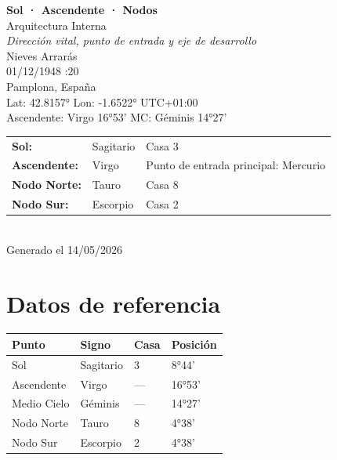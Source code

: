 \documentclass[11pt,a4paper]{article}
\begin{document}
\begin{titlepage}
  \centering
  \vspace*{1.5cm}
  {\Huge\bfseries\color{azulai} Sol · Ascendente · Nodos}\\[0.5cm]
  {\large\color{grisai} Arquitectura Interna}\\[0.3cm]
  {\small\itshape\color{grisai} Dirección vital, punto de entrada y eje de desarrollo}\\[2cm]
  {\huge\color{doradoai} Nieves Arrarás}\\[1.5cm]
  {\Large 01/12/1948 :20}\\[0.3cm]
  {\Large Pamplona, España}\\[0.3cm]
  {\normalsize Lat: 42.8157° \quad Lon: -1.6522° \quad UTC+01:00}\\[0.3cm]
  {\normalsize Ascendente: Virgo 16°53' \quad
    MC: Géminis 14°27'}\\[2cm]
  \begin{tabular}{lll}
    \textbf{Sol:} & Sagitario & Casa 3 \\
    \textbf{Ascendente:} & Virgo & Punto de entrada principal: Mercurio \\
    \textbf{Nodo Norte:} & Tauro & Casa 8 \\
    \textbf{Nodo Sur:}   & Escorpio & Casa 2 \\
  \end{tabular}\\[2cm]
  \vfill
  {\small Generado el 14/05/2026}
\end{titlepage}

\tableofcontents
\newpage

\section{Datos de referencia}

\begin{center}
\begin{tabular}{llll}
  \toprule
  \textbf{Punto} & \textbf{Signo} & \textbf{Casa} & \textbf{Posición} \\
  \midrule
  Sol           & Sagitario & 3 & 8°44' \\
  Ascendente    & Virgo & --- & 16°53' \\
  Medio Cielo   & Géminis & --- & 14°27' \\
  Nodo Norte    & Tauro & 8 & 4°38' \\
  Nodo Sur      & Escorpio & 2 & 4°38' \\
  \bottomrule
\end{tabular}
\end{center}
\end{document}
